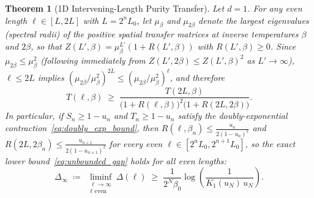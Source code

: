 \documentclass[11pt,a4paper]{article}
\newtheorem{theorem}{Theorem}[section]
\theoremstyle{definition}
\begin{document}
\begin{theorem}[1D Intervening-Length Purity Transfer]
\label{thm:intervening}
Let $d = 1$. For any even length $\ell \in [L, 2L]$ with $L = 2^n L_0$, let $\mu_\beta$ and $\mu_{2\beta}$ denote the largest eigenvalues (spectral radii) of the positive spatial transfer matrices at inverse temperatures $\beta$ and $2\beta$, so that $Z(L',\beta) = \mu_\beta^{L'}(1 + R(L',\beta))$ with $R(L',\beta) \ge 0$. Since $\mu_{2\beta} \le \mu_\beta^2$ (following immediately from $Z(L',2\beta) \le Z(L',\beta)^2$ as $L' \to \infty$), $\ell \le 2L$ implies $(\mu_{2\beta}/\mu_\beta^2)^{2L} \le (\mu_{2\beta}/\mu_\beta^2)^\ell$, and therefore
\begin{equation}
  T(\ell, \beta) \;\ge\; \frac{T(2L, \beta)}{\bigl(1 + R(\ell, \beta)\bigr)^2 \bigl(1 + R(2L, 2\beta)\bigr)}.
  \label{eq:intervening_transfer}
\end{equation}
In particular, if $S_n \ge 1 - u_n$ and $T_n \ge 1 - u_n$ satisfy the doubly-exponential contraction~\eqref{eq:doubly_exp_bound}, then $R(\ell, \beta_n) \le \frac{u_n}{2(1-u_n)^2}$ and $R(2L,2\beta_n) \le \frac{u_{n+1}}{2(1-u_{n+1})^2}$ for every even $\ell \in [2^n L_0, 2^{n+1} L_0]$, so the exact lower bound~\eqref{eq:unbounded_gap} holds for \emph{all} even lengths:
\begin{equation}
  \Delta_\infty \;\coloneqq\; \liminf_{\substack{\ell \to \infty \\ \ell \text{ even}}} \Delta(\ell)
  \;\ge\; \frac{1}{2^N \beta_0} \log\!\left(\frac{1}{K_1(u_N)\, u_N}\right).
  \label{eq:all_even_gap}
\end{equation}
\end{theorem}
\end{document}
